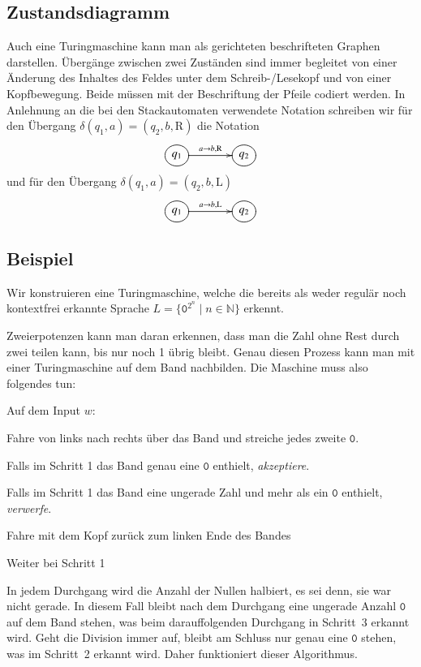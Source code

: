 \subsection{Zustandsdiagramm}
%
Auch eine Turingmaschine kann man als gerichteten beschrifteten Graphen
darstellen. Übergänge zwischen zwei Zuständen sind immer begleitet von
einer Änderung des Inhaltes des Feldes unter dem Schreib-/Lesekopf
und von einer Kopfbewegung. Beide müssen mit der Beschriftung
der Pfeile codiert werden. In Anlehnung an die bei den Stackautomaten
verwendete Notation schreiben wir für den Übergang
$\delta(q_1,a)=(q_2,b,\text{R})$
die Notation
\[
\entrymodifiers={++[o][F]}
\xymatrix @+5mm{
{q_1}\ar[r]^{a\to b,\text{R}}
	&{q_2}
}
\]
und für den Übergang
$\delta(q_1,a)=(q_2,b,\text{L})$
\[
\entrymodifiers={++[o][F]}
\xymatrix @+5mm{
{q_1}\ar[r]^{a\to b,\text{L}}
	&{q_2}
}
\]

\subsection{Beispiel}
Wir konstruieren eine Turingmaschine, welche die bereits als weder regulär
noch kontextfrei erkannte Sprache $L=\{\texttt{0}^{2^n}\;|\; n\in\mathbb N\}$
erkennt.

Zweierpotenzen kann man daran erkennen, dass man die Zahl ohne
Rest durch zwei teilen kann, bis nur noch 1 übrig bleibt. Genau
diesen Prozess kann man mit einer Turingmaschine auf dem Band
nachbilden. Die Maschine muss also folgendes tun:

Auf dem Input $w$:
\begin{compactenum}
\item Fahre von links nach rechts über das Band und streiche jedes zweite $\texttt{0}$.
\item Falls im Schritt 1 das Band genau eine $\texttt{0}$ enthielt, {\it akzeptiere}.
\item Falls im Schritt 1 das Band eine ungerade Zahl und mehr als ein $\texttt{0}$
enthielt, {\it verwerfe}.
\item Fahre mit dem Kopf zurück zum linken Ende des Bandes
\item Weiter bei Schritt 1
\end{compactenum}
In jedem Durchgang wird die Anzahl der Nullen halbiert, es sei denn,
sie war nicht gerade. In diesem Fall bleibt nach dem Durchgang eine
ungerade Anzahl $\texttt{0}$ auf dem Band stehen, was beim darauffolgenden Durchgang
in Schritt~3 erkannt wird. Geht die Division immer auf, bleibt am Schluss
nur genau eine $\texttt{0}$ stehen, was im Schritt~2 erkannt wird. Daher funktioniert
dieser Algorithmus.

